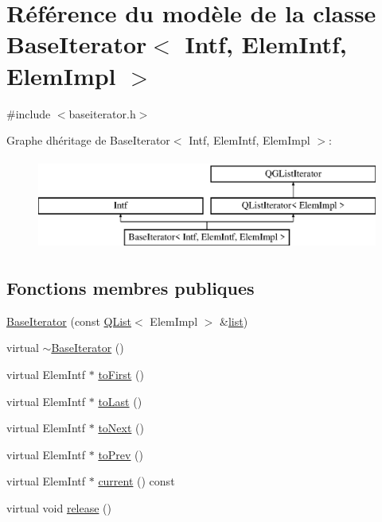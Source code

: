 \hypertarget{class_base_iterator}{}\section{Référence du modèle de la classe Base\+Iterator$<$ Intf, Elem\+Intf, Elem\+Impl $>$}
\label{class_base_iterator}


{\ttfamily \#include $<$baseiterator.\+h$>$}

Graphe d\textquotesingle{}héritage de Base\+Iterator$<$ Intf, Elem\+Intf, Elem\+Impl $>$\+:\begin{figure}[H]
\begin{center}
\leavevmode
\includegraphics[height=3.000000cm]{class_base_iterator}
\end{center}
\end{figure}
\subsection*{Fonctions membres publiques}
\begin{DoxyCompactItemize}
\item 
\hyperlink{class_base_iterator_a024b5a4dafe9f1129d9060e6d976174d}{Base\+Iterator} (const \hyperlink{class_q_list}{Q\+List}$<$ Elem\+Impl $>$ \&\hyperlink{class_q_g_list_iterator_a6e606950ab50b273e8370d9e24756bf2}{list})
\item 
virtual \hyperlink{class_base_iterator_aa4d9bfd5be1f05fc41c23323fcee916e}{$\sim$\+Base\+Iterator} ()
\item 
virtual Elem\+Intf $\ast$ \hyperlink{class_base_iterator_adedd8ee5a49a70b2a9177125b2e19e3c}{to\+First} ()
\item 
virtual Elem\+Intf $\ast$ \hyperlink{class_base_iterator_a2444c29b78a5294c1aab1a6c3ca718c6}{to\+Last} ()
\item 
virtual Elem\+Intf $\ast$ \hyperlink{class_base_iterator_ab1c32f7ac3d1d4d759e15aa9cc466be4}{to\+Next} ()
\item 
virtual Elem\+Intf $\ast$ \hyperlink{class_base_iterator_a93b9aedc8f3aed39e3d2a0fa6d70240d}{to\+Prev} ()
\item 
virtual Elem\+Intf $\ast$ \hyperlink{class_base_iterator_ac9d6d87ea09af99b56a4788e28b805c9}{current} () const 
\item 
virtual void \hyperlink{class_base_iterator_abb1dc61b349335e463c1cb848ca9e3ee}{release} ()
\end{DoxyCompactItemize}
